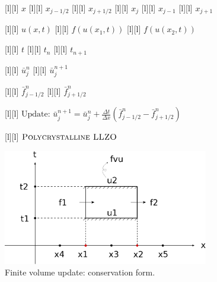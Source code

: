 \begin{figure}[ht]
	\centering
	\footnotesize

	[l] {$x$}
	[l] {$x_{j-1/2}$}
	[l] {$x_{j+1/2}$}
	[l] {$x_{j}$}
	[l] {$x_{j-1}$}
	[l] {$x_{j+1}$}

	[l] {$u(x,t)$}
	[l] {$f(u(x_{1},t))$}
	[l] {$f(u(x_{2},t))$}

	[l] {$t$}
	[l] {$t_{n}$}
	[l] {$t_{n+1}$}

	[l] {$\bar{u}^{n}_{j}$}
	[l] {$\bar{u}^{n+1}_{j}$}

	[l] {$\bar{f}^{n}_{j-1/2}$}
	[l] {$\bar{f}^{n}_{j+1/2}$}

	[l] {$\text{Update: }\displaystyle \bar{u}^{n+1}_{j} =
			\bar{u}^{n}_{j} + \frac{\Delta t}{\Delta x}
			\left(\bar{f}^{n}_{j-1/2} - \bar{f}^{n}_{j+1/2} \right)$}

	[l] {$\textsc{Polycrystalline LLZO}$}

	\includegraphics[width=0.8\textwidth]{conservationform.eps}
	\caption{Finite volume update: conservation form.}
	\label{\LABEL}
\end{figure}
